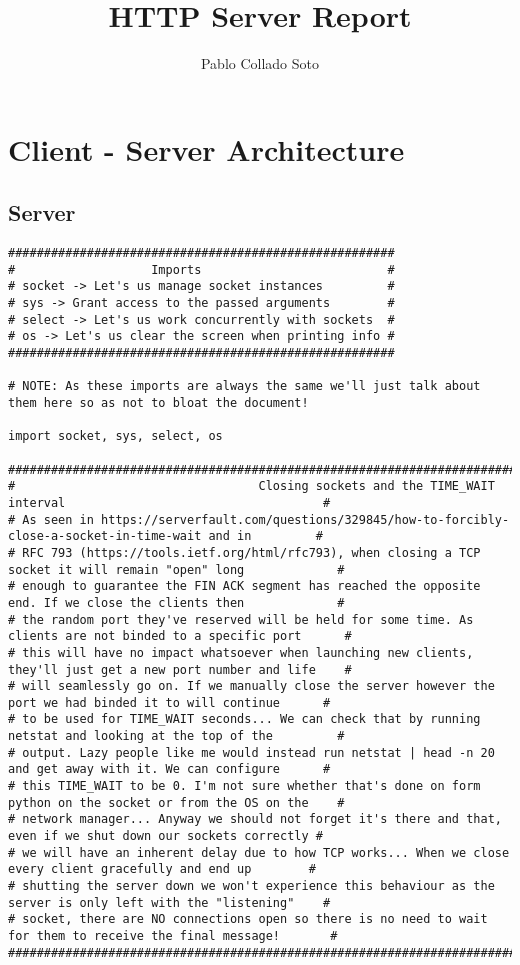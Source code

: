 \documentclass[landscape]{article}
\title{HTTP Server Report}
\author{Pablo Collado Soto}
\date{}
\begin{document}
    \maketitle

    \section{Client - Server Architecture}
        \subsection{Server}
            \begin{verbatim}
######################################################
#                   Imports                          #
# socket -> Let's us manage socket instances         #
# sys -> Grant access to the passed arguments        #
# select -> Let's us work concurrently with sockets  #
# os -> Let's us clear the screen when printing info #
######################################################

# NOTE: As these imports are always the same we'll just talk about them here so as not to bloat the document!

import socket, sys, select, os

##################################################################################################################
#                                  Closing sockets and the TIME_WAIT interval                                    #
# As seen in https://serverfault.com/questions/329845/how-to-forcibly-close-a-socket-in-time-wait and in         #
# RFC 793 (https://tools.ietf.org/html/rfc793), when closing a TCP socket it will remain "open" long             #
# enough to guarantee the FIN ACK segment has reached the opposite end. If we close the clients then             #
# the random port they've reserved will be held for some time. As clients are not binded to a specific port      #
# this will have no impact whatsoever when launching new clients, they'll just get a new port number and life    #
# will seamlessly go on. If we manually close the server however the port we had binded it to will continue      #
# to be used for TIME_WAIT seconds... We can check that by running netstat and looking at the top of the         #
# output. Lazy people like me would instead run netstat | head -n 20 and get away with it. We can configure      #
# this TIME_WAIT to be 0. I'm not sure whether that's done on form python on the socket or from the OS on the    #
# network manager... Anyway we should not forget it's there and that, even if we shut down our sockets correctly #
# we will have an inherent delay due to how TCP works... When we close every client gracefully and end up        #
# shutting the server down we won't experience this behaviour as the server is only left with the "listening"    #
# socket, there are NO connections open so there is no need to wait for them to receive the final message!       #
##################################################################################################################


\end{verbatim}
\end{document}
